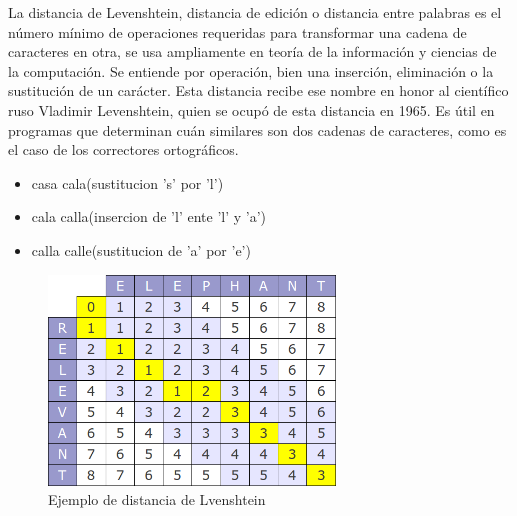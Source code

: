 \documentclass{beamer}
\begin{document}
\begin{frame}
	\begin{minipage}{10 cm}
La distancia de Levenshtein, distancia de edición o distancia entre palabras es el número mínimo de operaciones requeridas para transformar una cadena de caracteres en otra, se usa ampliamente en teoría de la información y ciencias de la computación. Se entiende por operación, bien una inserción, eliminación o la sustitución de un carácter. Esta distancia recibe ese nombre en honor al científico ruso Vladimir Levenshtein, quien se ocupó de esta distancia en 1965. Es útil en programas que determinan cuán similares son dos cadenas de caracteres, como es el caso de los correctores ortográficos. 
		\begin{itemize}
			\item casa cala(sustitucion 's' por 'l')
			\item cala calla(insercion de 'l' ente 'l' y 'a')
                   \item  calla calle(sustitucion de 'a' por 'e')
		\end{itemize}
	\end{minipage}
\end{frame}

\begin{figure}[h]
    \centering
	\includegraphics[width=0.68\textwidth]{imagenes/diagrama.png}
    \caption{Ejemplo de distancia de Lvenshtein}
    \label{img:3}
\end{figure}
\end{document}
